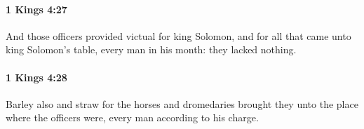 		\paragraph{1 Kings 4:27} %
			\label{1KINGS-4-27}

			And those officers provided victual for king Solomon, and for all that came unto king Solomon’s table, every man in his month: they lacked nothing.


		\paragraph{1 Kings 4:28} %
			\label{1KINGS-4-28}

			Barley also and straw for the horses and dromedaries brought they unto the place where the officers were, every man according to his charge.


